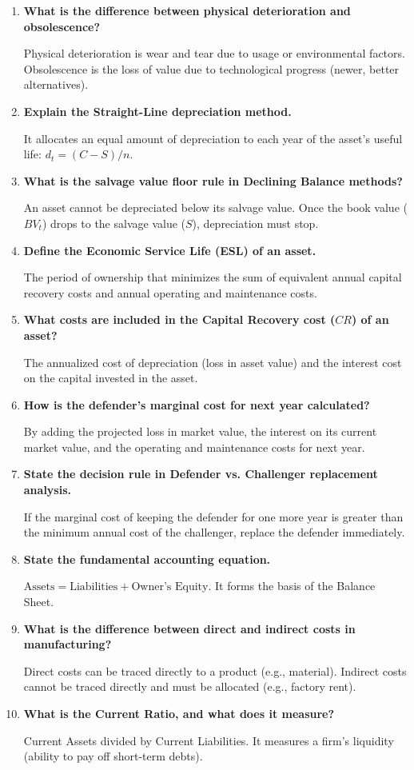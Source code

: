 \documentclass[12pt,a4paper]{article}
\newcommand{\Q}[1]{\textbf{#1}\par\noindent\ignorespaces}
\begin{document}
\begin{tcolorbox}[exambox, title={\textbf{Frequently Asked / Viva Questions}}]
\begin{enumerate}[topsep=0pt, label=\textbf{Q\arabic*.}, itemsep=5pt]
  \item \Q{What is the difference between physical deterioration and obsolescence?}
    Physical deterioration is wear and tear due to usage or environmental factors. Obsolescence is the loss of value due to technological progress (newer, better alternatives).
  \item \Q{Explain the Straight-Line depreciation method.}
    It allocates an equal amount of depreciation to each year of the asset's useful life: $d_t = (C-S)/n$.
  \item \Q{What is the salvage value floor rule in Declining Balance methods?}
    An asset cannot be depreciated below its salvage value. Once the book value ($BV_t$) drops to the salvage value ($S$), depreciation must stop.
  \item \Q{Define the Economic Service Life (ESL) of an asset.}
    The period of ownership that minimizes the sum of equivalent annual capital recovery costs and annual operating and maintenance costs.
  \item \Q{What costs are included in the Capital Recovery cost ($CR$) of an asset?}
    The annualized cost of depreciation (loss in asset value) and the interest cost on the capital invested in the asset.
  \item \Q{How is the defender's marginal cost for next year calculated?}
    By adding the projected loss in market value, the interest on its current market value, and the operating and maintenance costs for next year.
  \item \Q{State the decision rule in Defender vs. Challenger replacement analysis.}
    If the marginal cost of keeping the defender for one more year is greater than the minimum annual cost of the challenger, replace the defender immediately.
  \item \Q{State the fundamental accounting equation.}
    $\text{Assets} = \text{Liabilities} + \text{Owner's Equity}$. It forms the basis of the Balance Sheet.
  \item \Q{What is the difference between direct and indirect costs in manufacturing?}
    Direct costs can be traced directly to a product (e.g., material). Indirect costs cannot be traced directly and must be allocated (e.g., factory rent).
  \item \Q{What is the Current Ratio, and what does it measure?}
    Current Assets divided by Current Liabilities. It measures a firm's liquidity (ability to pay off short-term debts).


\end{enumerate}
\end{tcolorbox}
\end{document}
